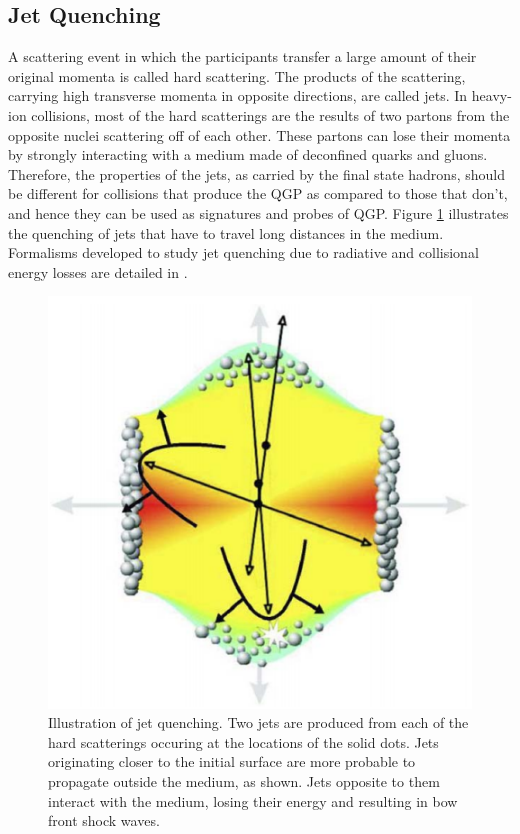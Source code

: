 \subsection{Jet Quenching}
A scattering event in which the participants transfer a large amount of their original momenta is called hard scattering. The products of the scattering, carrying high transverse momenta in opposite directions, are called jets. In heavy-ion collisions, most of the hard scatterings are the results of two partons from the opposite nuclei scattering off of each other. These partons can lose their momenta by strongly interacting with a medium made of deconfined quarks and gluons. Therefore, the properties of the jets, as carried by the final state hadrons, should be different for collisions that produce the QGP as compared to those that don't, and hence they can be used as signatures and probes of QGP. Figure \ref{fig:jets} illustrates the quenching of jets that have to travel long distances in the medium. %
Formalisms developed to study jet quenching due to radiative and collisional energy losses are detailed in \cite{2015IJMPE..2430014Q}. 
	\begin{figure}[h]
	  \centering
	  \includegraphics[width=4.5in]{figures/jets.PNG}
	  \caption{Illustration of jet quenching. Two jets are produced from each of the hard scatterings occuring at the locations of the solid dots. Jets originating closer to the initial surface are more probable to propagate outside the medium, as shown. Jets opposite to them interact with the medium, losing their energy and resulting in bow front shock waves.\cite{STOCKER2005121}}\label{fig:jets}
	\end{figure}



